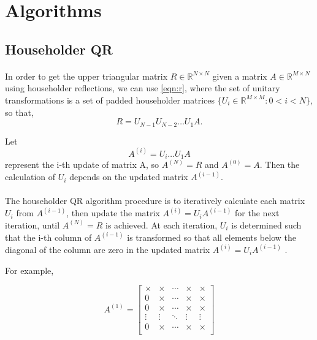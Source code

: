 \documentclass{article}
\begin{document}
\section{Algorithms}
\subsection{Householder QR}
\paragraph{}
In order to get the upper triangular matrix $R \in\mathbb{R}^{N\times{}N}$ given a matrix $A \in\mathbb{R}^{M\times{}N}$ using householder reflections, we can use \eqref{eqn:r}, where the set of unitary transformations is a set of padded householder matrices $\{U_i\in\mathbb{R}^{M\times{}M} : 0 < i < N\}$, so that,
\begin{equation}
R = U_{N-1} U_{N-2} \dots U_1A.
\end{equation}

Let 
\begin{equation}
A^{(i)}=U_{i} \dots U_1A
\end{equation}
represent the i-th update of matrix A, so $A^{(N)}=R$ and $A^{(0)} = A$. Then the calculation of $U_i$ depends on the updated matrix $A^{(i-1)}$.
\paragraph{}
The householder QR algorithm procedure is to iteratively calculate each matrix $U_i$ from $A^{(i-1)}$, then update the matrix $A^{(i)} = U_iA^{(i-1)}$ for the next iteration, until $A^{(N)}=R$ is achieved. At each iteration, $U_i$ is determined such that the i-th column of $A^{(i-1)}$ is transformed so that all elements below the diagonal of the column are zero in the updated matrix $A^{(i)} = U_iA^{(i-1)}$ \cite{golub} \cite{doi:10.1137/19M1296367}.

For example,

\begin{equation}
A^{(1)} =
\begin{bmatrix}
\times & \times & \cdots & \times & \times\\
0 & \times  & \cdots & \times & \times\\
0 & \times  & \cdots & \times & \times\\
\vdots & \vdots  & \ddots & \vdots & \vdots\\
0 & \times  & \cdots & \times & \times\\
\end{bmatrix}
\end{equation}
\end{document}
